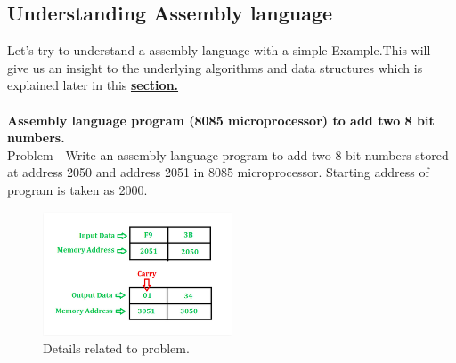 \documentclass[12pt]{article}
\begin{document}
\subsection{Understanding Assembly language }
Let's try to understand a assembly language with a simple Example.This will give us an insight to the underlying algorithms and data structures which is explained later in this \hyperlink{link_algo}{\textbf{section.}}\\\\
\textbf{Assembly language program (8085 microprocessor) to add two 8 bit numbers.}\\
Problem - Write an assembly language program to add two 8 bit numbers stored at address 2050 and address 2051 in 8085 microprocessor. Starting address of program is taken as 2000.\\
\begin{figure}[H]
\centering
\includegraphics[width=0.5\textwidth]{geeks.png}
\caption{\label{fig:prob}Details related to problem.}
\end{figure}
\end{document}

